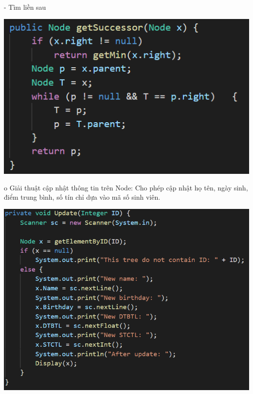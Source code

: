 \documentclass{report}
\begin{document}
- Tìm liền sau
\begin{center}
     \includegraphics[scale=1]{m}
    \end{center}
    
o Giải thuật cập nhật thông tin trên Node: Cho phép cập nhật họ tên, ngày sinh, điểm trung bình, số tín chỉ dựa vào mã số sinh viên. 
\begin{center}
     \includegraphics[scale=1]{n}
    \end{center}
\end{document}
